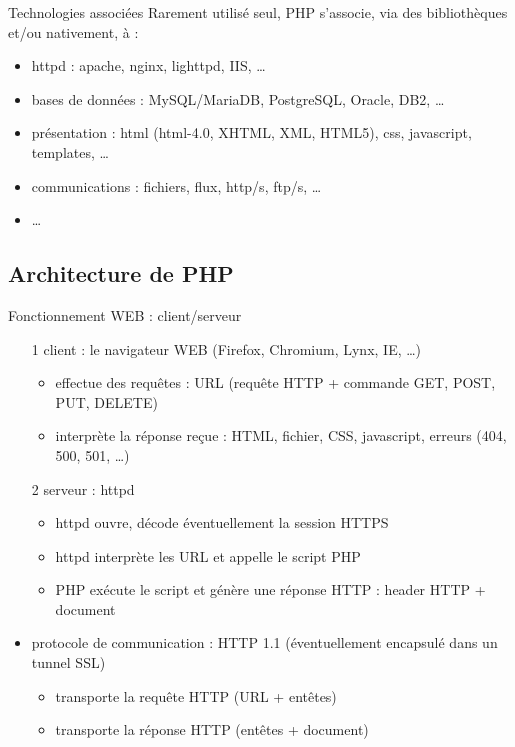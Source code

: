 \documentclass{beamer}
\begin{document}
\begin{frame}{Technologies associées}
	Rarement utilisé seul, PHP s’associe, via des bibliothèques et/ou nativement, à :
	\begin{itemize}
		\item httpd : apache, nginx, lighttpd, IIS, \ldots
		\item bases de données : MySQL/MariaDB, PostgreSQL, Oracle, DB2, \ldots
		\item présentation : html (html-4.0, XHTML, XML, HTML5), css, javascript, templates, \ldots
		\item communications : fichiers, flux, http/s, ftp/s, \ldots
		\item \ldots
	\end{itemize}
\end{frame}

\subsection{Architecture de PHP}

\begin{frame}{Fonctionnement WEB : client/serveur}
	\begin{itemize}
		\item[1] client : le navigateur WEB (Firefox, Chromium, Lynx, IE, \ldots)
			\begin{itemize}
				\item effectue des requêtes : URL (requête HTTP + commande GET, POST, PUT, DELETE)
				\item interprète la réponse reçue : HTML, fichier, CSS, javascript, erreurs (404, 500, 501, \ldots) 
			\end{itemize} 
		\item[2] serveur : httpd 
			\begin{itemize}
				\item httpd ouvre, décode éventuellement la session HTTPS
				\item httpd interprète les URL et appelle le script PHP
				\item PHP exécute le script et génère une réponse HTTP : header HTTP + document
			\end{itemize}
		\item protocole de communication : HTTP 1.1 (éventuellement encapsulé dans un tunnel SSL)
		 	\begin{itemize}
		 		\item transporte la requête HTTP (URL + entêtes)
		 		\item transporte la réponse HTTP (entêtes + document)
		 	\end{itemize}
	\end{itemize}
\end{frame}
\end{document}
